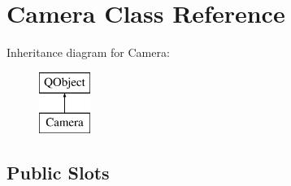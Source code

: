 \hypertarget{class_camera}{}\section{Camera Class Reference}
\label{class_camera}
Inheritance diagram for Camera\+:\begin{figure}[H]
\begin{center}
\leavevmode
\includegraphics[height=2.000000cm]{class_camera}
\end{center}
\end{figure}
\subsection*{Public Slots}
